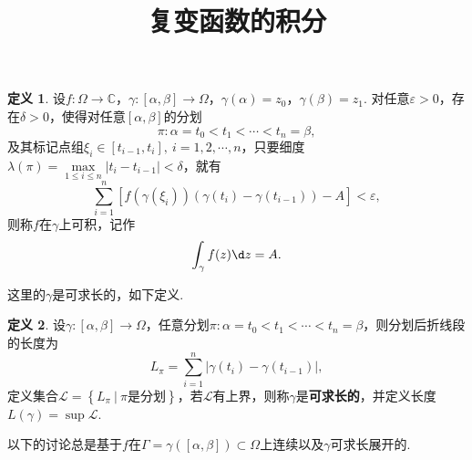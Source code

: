 \documentclass[12pt]{ctexart}
\title{\vspace{-2em}\textbf{复变函数的积分}\vspace{-2em}}
\date{ }
\theoremstyle{definition}
\newtheorem{definition}{定义}
\theoremstyle{plain}
\begin{document}
	\maketitle
	\begin{definition}
		设$f:\varOmega\to\mathbb{C}$，$\gamma:\left[\alpha,\beta\right]\to\varOmega$，$\gamma(\alpha)=z_0$，$\gamma(\beta)=z_1$. 对任意$\varepsilon>0$，存在$\delta>0$，使得对任意$\left[\alpha,\beta\right]$的分划
		$$\pi:\alpha=t_0<t_1<\cdots<t_n=\beta,$$
		及其标记点组$\xi_i\in\left[t_{i-1},t_i\right],\ i=1,2,\cdots,n$，只要细度$\lambda(\pi)=\max\limits_{1\leqslant i\leqslant n}|t_{i}-t_{i-1}|<\delta$，就有
		$$\sum_{i=1}^{n}\left[f\left(\gamma(\xi_i)\right)\left(\gamma(t_i)-\gamma(t_{i-1})\right)-A\right]<\varepsilon,$$
		则称$f$在$\gamma$上可积，记作
		$$\int_{\gamma}f(z)\d z=A.$$
	\end{definition}
	这里的$\gamma$是可求长的，如下定义.
	\begin{definition}
		设$\gamma:\left[\alpha,\beta\right]\to\varOmega$，任意分划$\pi:\alpha=t_0<t_1<\cdots<t_n=\beta$，则分划后折线段的长度为
		$$L_{\pi}=\sum_{i=1}^{n}\left|\gamma(t_i)-\gamma(t_{i-1})\right|,$$
		定义集合$\mathcal{L}=\left\{L_{\pi}\ |\ \pi\text{是分划}\right\}$，若$\mathcal{L}$有上界，则称$\gamma$是\textbf{可求长的}，并定义长度$L(\gamma)=\sup\mathcal{L}$.
	\end{definition}
	以下的讨论总是基于$f$在$\varGamma=\gamma(\left[\alpha,\beta\right])\subset\varOmega$上连续以及$\gamma$可求长展开的.
	
\end{document}
